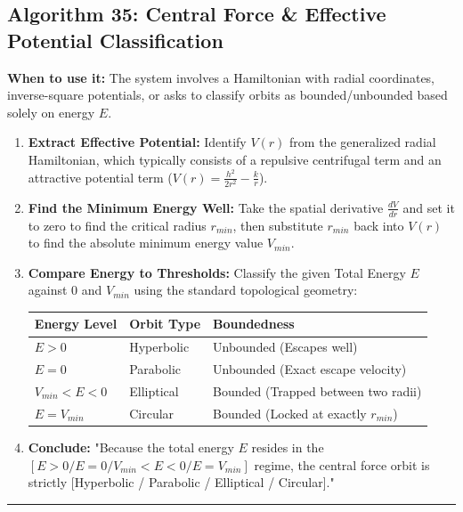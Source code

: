 \documentclass[11pt, a4paper]{report}
\begin{document}
\subsection*{Algorithm 35: Central Force \& Effective Potential Classification}
\textbf{When to use it:} The system involves a Hamiltonian with radial coordinates, inverse-square potentials, or asks to classify orbits as bounded/unbounded based solely on energy $E$.
\begin{enumerate}[label=\textbf{\arabic*.}]
    \item \textbf{Extract Effective Potential:} Identify $V(r)$ from the generalized radial Hamiltonian, which typically consists of a repulsive centrifugal term and an attractive potential term ($V(r) = \frac{h^2}{2r^2} - \frac{k}{r}$).
    \item \textbf{Find the Minimum Energy Well:} Take the spatial derivative $\frac{dV}{dr}$ and set it to zero to find the critical radius $r_{min}$, then substitute $r_{min}$ back into $V(r)$ to find the absolute minimum energy value $V_{min}$.
    \item \textbf{Compare Energy to Thresholds:} Classify the given Total Energy $E$ against $0$ and $V_{min}$ using the standard topological geometry:
    \begin{center}
    \begin{tabular}{|l|l|l|}
    \hline
    \textbf{Energy Level} & \textbf{Orbit Type} & \textbf{Boundedness} \\ \hline
    $E > 0$ & Hyperbolic & Unbounded (Escapes well) \\ \hline
    $E = 0$ & Parabolic & Unbounded (Exact escape velocity) \\ \hline
    $V_{min} < E < 0$ & Elliptical & Bounded (Trapped between two radii) \\ \hline
    $E = V_{min}$ & Circular & Bounded (Locked at exactly $r_{min}$) \\ \hline
    \end{tabular}
    \end{center}
    \item \textbf{Conclude:} "Because the total energy $E$ resides in the $[E > 0 / E = 0 / V_{min} < E < 0 / E = V_{min}]$ regime, the central force orbit is strictly [Hyperbolic / Parabolic / Elliptical / Circular]."
\end{enumerate}
\vspace{1em}
\noindent\rule{\textwidth}{0.4pt}
\vspace{1em}
\end{document}
